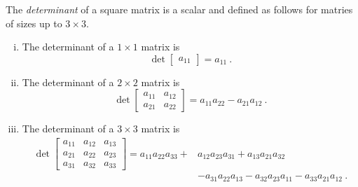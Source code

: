 \begin{definition}[Determinants]
The \emph{determinant} of a square matrix is a scalar and defined as follows for matries of sizes up to $3 \times 3$.
\begin{enumerate}[(i)]
	\item The determinant of a $1 \times 1$ matrix is
	\[ \det \begin{bmatrix} a_{11} \end{bmatrix} = a_{11} \:. \]
	\item The determinant of a $2 \times 2$ matrix is
	\[ \det\begin{bmatrix} a_{11} & a_{12} \\ a_{21} & a_{22} \end{bmatrix}
	= a_{11}a_{22} - a_{21}a_{12} \:. \]
	\item The determinant of a $3 \times 3$ matrix is
	\begin{equation*}
	\begin{split} \det\begin{bmatrix} a_{11} & a_{12} & a_{13} \\ a_{21} & a_{22} & a_{23} \\ a_{31} & a_{32} & a_{33} \end{bmatrix} = a_{11}a_{22}a_{33} + & a_{12}a_{23}a_{31} + a_{13}a_{21}a_{32} \\ & - a_{31}a_{22}a_{13} - a_{32}a_{23}a_{11} - a_{33}a_{21}a_{12} \:.
	\end{split}
	\end{equation*}
\end{enumerate}
\end{definition}

